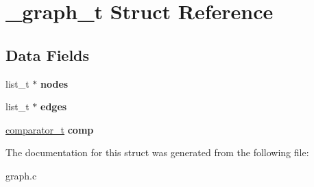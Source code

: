 \hypertarget{struct__graph__t}{}\section{\+\_\+graph\+\_\+t Struct Reference}
\label{struct__graph__t}
\subsection*{Data Fields}
\begin{DoxyCompactItemize}
\item 
\hypertarget{struct__graph__t_ab86e396ebcfbb265a86c2b6eb0864d28}{}list\+\_\+t $\ast$ {\bfseries nodes}\label{struct__graph__t_ab86e396ebcfbb265a86c2b6eb0864d28}

\item 
\hypertarget{struct__graph__t_a53976af64ae8e55c420f3e2c094a1eda}{}list\+\_\+t $\ast$ {\bfseries edges}\label{struct__graph__t_a53976af64ae8e55c420f3e2c094a1eda}

\item 
\hypertarget{struct__graph__t_a905fe101070b8d9260af6d2dd8506868}{}\hyperlink{util_8h_a49b4e67d12d0b82395b75063127fff0b}{comparator\+\_\+t} {\bfseries comp}\label{struct__graph__t_a905fe101070b8d9260af6d2dd8506868}

\end{DoxyCompactItemize}


The documentation for this struct was generated from the following file\+:\begin{DoxyCompactItemize}
\item 
graph.\+c\end{DoxyCompactItemize}
